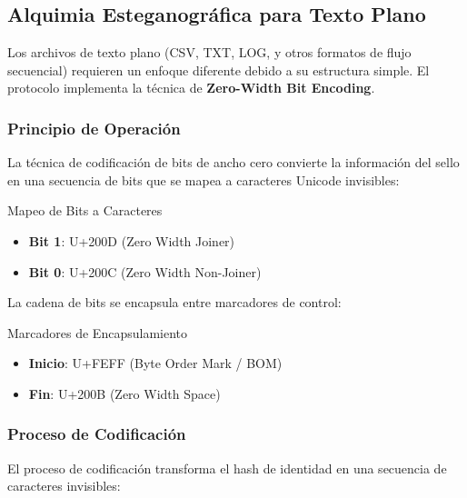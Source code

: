 \subsection{Alquimia Esteganográfica para Texto Plano}
\label{sec:ai-texto}

Los archivos de texto plano (CSV, TXT, LOG, y otros formatos de flujo secuencial) requieren un enfoque diferente debido a su estructura simple. El protocolo implementa la técnica de \textbf{Zero-Width Bit Encoding}.


\subsubsection{Principio de Operación}

La técnica de codificación de bits de ancho cero convierte la información del sello en una secuencia de bits que se mapea a caracteres Unicode invisibles:

\begin{caja}{Mapeo de Bits a Caracteres}
\begin{itemize}
\item \textbf{Bit 1}: U+200D (Zero Width Joiner)
\item \textbf{Bit 0}: U+200C (Zero Width Non-Joiner)
\end{itemize}
\end{caja}

La cadena de bits se encapsula entre marcadores de control:

\begin{caja}{Marcadores de Encapsulamiento}
\begin{itemize}
\item \textbf{Inicio}: U+FEFF (Byte Order Mark / BOM)
\item \textbf{Fin}: U+200B (Zero Width Space)
\end{itemize}
\end{caja}

\subsubsection{Proceso de Codificación}

El proceso de codificación transforma el hash de identidad en una secuencia de caracteres invisibles:

